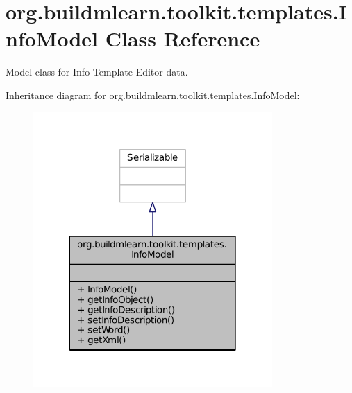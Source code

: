 \hypertarget{classorg_1_1buildmlearn_1_1toolkit_1_1templates_1_1InfoModel}{\section{org.\-buildmlearn.\-toolkit.\-templates.\-Info\-Model Class Reference}
\label{classorg_1_1buildmlearn_1_1toolkit_1_1templates_1_1InfoModel}
}


Model class for Info Template Editor data.  




Inheritance diagram for org.\-buildmlearn.\-toolkit.\-templates.\-Info\-Model\-:
\nopagebreak
\begin{figure}[H]
\begin{center}
\leavevmode
\includegraphics[width=258pt]{dd/dce/classorg_1_1buildmlearn_1_1toolkit_1_1templates_1_1InfoModel__inherit__graph}
\end{center}
\end{figure}


